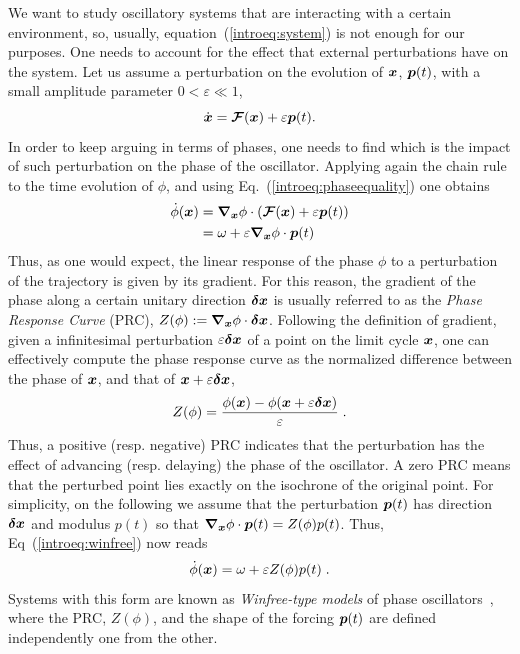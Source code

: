 We want to study oscillatory systems that are interacting with a certain environment, so, usually,
equation~(\ref{introeq:system}) is not enough for our purposes. One needs to
account for the effect that external perturbations have on the system.
Let us assume a perturbation on the evolution of $\boldsymbol{x}$, $\boldsymbol{p}(t)$, with a small amplitude parameter $ 0<\varepsilon \ll 1$,
\begin{equation}
 \dot{\boldsymbol{x}}=\boldsymbol{\mathcal {F}}(\boldsymbol{x})+\varepsilon \boldsymbol{p}(t).
\end{equation}
In order to keep arguing in terms of phases, one needs to find which is the impact of
such perturbation on the phase of the oscillator.
Applying again the chain rule to the time evolution of $\phi$, and using Eq.~(\ref{introeq:phaseequality}) one obtains
\begin{align}
\dot \phi(\boldsymbol{x})
&=\grad_{\boldsymbol{x}}\phi \cdot \left(\boldsymbol{\mathcal{F}}(\boldsymbol{x})+\varepsilon \boldsymbol{p}(t)\right) \\
&=\omega+\varepsilon \grad_{\boldsymbol{x}}\phi\cdot \boldsymbol{p}(t) \label{introeq:winfree}
\end{align}
Thus, as one would expect, the linear response of the phase $\phi$ to a perturbation of the trajectory is given by its gradient.
For this reason, the gradient of the phase along a certain unitary direction $\boldsymbol{\delta x}$ is usually referred to as the \emph{Phase Response Curve} (PRC), $Z(\phi):=\grad_{\boldsymbol{ x}}\phi \cdot \boldsymbol{\delta x}$.
Following the definition of gradient, given a infinitesimal  perturbation $\varepsilon \boldsymbol{\delta x}$ of a point on the limit cycle $\boldsymbol{x}$,
 one can effectively compute the phase response curve as the normalized difference between the phase of $\boldsymbol{x}$,
 and that of $\boldsymbol{x}+\varepsilon \boldsymbol{\delta x}$,
\begin{equation}
Z(\phi)=\frac{ \phi(\boldsymbol{x})-\phi(\boldsymbol{ x}+\varepsilon\boldsymbol{\delta x}) }{\varepsilon  }\;.
\end{equation}
Thus, a positive (resp. negative) PRC indicates that the perturbation has the effect of advancing (resp. delaying) the phase of the oscillator.
A zero PRC means that the perturbed point lies exactly on the isochrone of the original point.
For simplicity, on the following we assume that the perturbation $\boldsymbol{p}(t)$ has direction $\boldsymbol{\delta x}$ and modulus $p(t)$ so that
$\grad_{\boldsymbol{x}}\phi\cdot \boldsymbol{p}(t)=Z(\phi) p(t)$. Thus, Eq~(\ref{introeq:winfree}) now reads
\begin{equation}\label{introeq:winfree2}
\dot \phi(\boldsymbol{x})=\omega + \varepsilon Z(\phi)p(t)\;.
\end{equation}
Systems with this form are known as \emph{Winfree-type models} of phase oscillators~\cite{Winfree2001},
where the PRC, $Z(\phi)$, and the shape of the forcing $\boldsymbol{p}(t)$ are defined independently one from the other.

